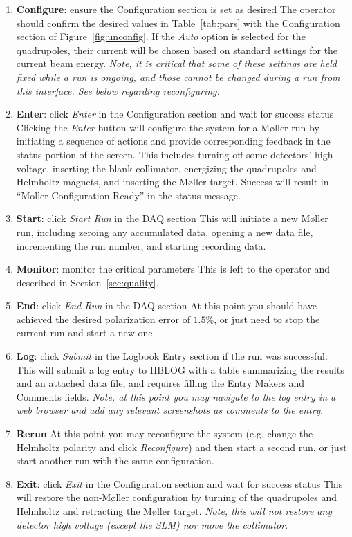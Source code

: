 \documentclass[amsmath,amssymb,notitlepage,12pt]{revtex4}
\begin{document}
\begin{enumerate}
\item {\bf Configure}:  ensure the Configuration section is set as desired
        \subitem
        The operator should confirm the desired values in Table~\ref{tab:pars} with the Configuration section of Figure~\ref{fig:unconfig}.  If the {\em Auto} option is selected for the quadrupoles, their current will be chosen based on standard settings for the current beam energy.  {\em Note, it is critical that some of these settings are held fixed while a run is ongoing, and those cannot be changed during a run from this interface.  See below regarding reconfiguring.}
\item {\bf Enter}: click {\em Enter} in the Configuration section and wait for success status
    \subitem Clicking the {\em Enter} button will configure the system for a M{\o}ller run by initiating a sequence of actions and provide corresponding feedback in the status portion of the screen.  This includes turning off some detectors' high voltage, inserting the blank collimator, energizing the quadrupoles and Helmholtz magnets, and inserting the M{\o}ller target.  Success will result in ``Moller Configuration Ready'' in the status message.
\item {\bf Start}: click {\em Start Run} in the DAQ section
    \subitem This will initiate a new M{\o}ller run, including zeroing any accumulated data, opening a new data file, incrementing the run number, and starting recording data.
\item {\bf Monitor}: monitor the critical parameters
    \subitem This is left to the operator and described in Section~\ref{sec:quality}.
\item {\bf End}: click {\em End Run} in the DAQ section
    \subitem At this point you should have achieved the desired polarization error of $1.5\%$, or just need to stop the current run and start a new one.
\item {\bf Log}: click {\em Submit} in the Logbook Entry section if the run was successful. 
    \subitem This will submit a log entry to HBLOG with a table summarizing the results and an attached data file, and requires filling the Entry Makers and Comments fields.  {\em Note, at this point you may navigate to the log entry in a web browser and add any relevant screenshots as comments to the entry}.
\item {\bf Rerun}  At this point you may reconfigure the system (e.g. change the Helmholtz polarity and click {\em Reconfigure}) and then start a second run, or just start another run with the same configuration.
\item {\bf Exit}: click {\em Exit} in the Configuration section and wait for success status
    \subitem  This will restore the non-M{\o}ller configuration by turning of the quadrupoles and Helmholtz and retracting the M{\o}ller target.  {\em Note, this will not restore any detector high voltage (except the SLM) nor move the collimator}. 
\end{enumerate}
\end{document}
